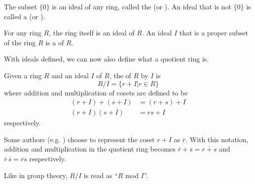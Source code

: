 \begin{example}
    The subset $\{0\}$ is an ideal of any ring, called the  (or ). An ideal that is not $\{0\}$ is called a  (or ).
\end{example}
\begin{example}
    For any ring $R$, the ring itself is an ideal of $R$. An ideal $I$ that is a proper subset of the ring $R$ is a  of $R$.
\end{example}

With ideals defined, we can now also define what a quotient ring is.

\begin{definition}
    Given a ring $R$ and an ideal $I$ of $R$, the  of $R$ by $I$ is
    \[
        R/I = \{r + I \vert r \in R\}
    \]
    where addition and multiplication of cosets are defined to be
    \begin{align*}
        (r+I)+(s+I) &= (r+s) + I\\
        (r+I)(s+I) &= rs + I
    \end{align*}
    respectively.
\end{definition}
\begin{remark}
    Some authors (e.g. \cite[p.~243]{dummit_foote_2004}) choose to represent the coset $r + I$ as $\overline{r}$. With this notation, addition and multiplication in the quotient ring becomes $\overline{r}+\overline{s} = \overline{r+s}$ and $\overline{r}\,\overline{s} = \overline{rs}$ respectively.
\end{remark}
\begin{remark}
    Like in group theory, $R/I$ is read as ``$R$ mod $I$''.
\end{remark}


